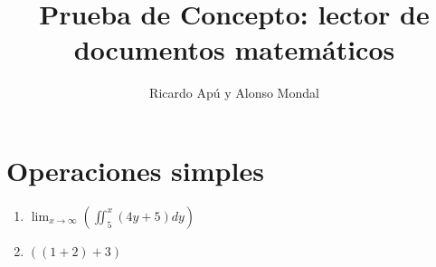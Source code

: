 \documentclass[11pt]{article}
\title{Prueba de Concepto: lector de documentos matemáticos}
\author{Ricardo Apú y Alonso Mondal}
\begin{document}
\maketitle
\section{Operaciones simples}
\begin{enumerate}
\item {$\lim_{x \to \infty} (\iint_{5}^{x} (4y+5) dy)$}
\item{$((1+2)+3)$}
\end{enumerate}
\end{document}

